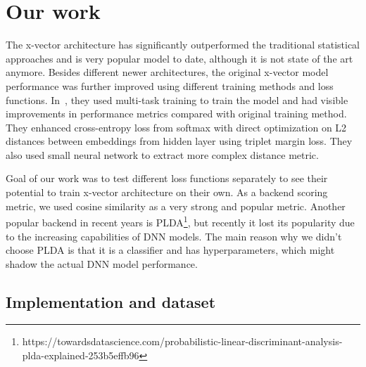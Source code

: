 \section{Our work}
The x-vector architecture has significantly outperformed the traditional statistical approaches and is very popular model to date, although it is not state of the art anymore. Besides different newer architectures, the original x-vector model performance was further improved using different training methods and loss functions. In~\cite{x_vectors_triplet}, they used multi-task training to train the model and had visible improvements in performance metrics compared with original training method. They enhanced cross-entropy loss from softmax with direct optimization on L2 distances between embeddings from hidden layer using triplet margin loss. They also used small neural network to extract more complex distance metric.

\medskip
Goal of our work was to test different loss functions separately to see their potential to train x-vector architecture on their own. As a backend scoring metric, we used cosine similarity as a very strong and popular metric. Another popular backend in recent years is PLDA\footnote{https://towardsdatascience.com/probabilistic-linear-discriminant-analysis-plda-explained-253b5effb96}, but recently it lost its popularity due to the increasing capabilities of DNN models. The main reason why we didn't choose PLDA is that it is a classifier and has hyperparameters, which might shadow the actual DNN model performance. 

\subsection*{Implementation and dataset}

